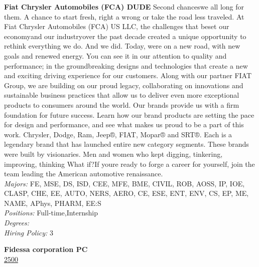 \documentclass[twoside]{article}
\begin{document}
\begin{center}
\begin{multicols}{2}
\begin{minipage}{.95\columnwidth}{\Large\bf Fiat Chrysler Automobiles (FCA) \hfill DUDE}
    Second chanceswe all long for them. A chance to start fresh, right a wrong or take the road less traveled. At Fiat Chrysler Automobiles (FCA) US LLC, the challenges that beset our economyand our industryover the past decade created a unique opportunity to rethink everything we do. And we did. Today, were on a new road, with new goals and renewed energy. You can see it in our attention to quality and performance; in the groundbreaking designs and technologies that create a new and exciting driving experience for our customers. Along with our partner FIAT Group, we are building on our proud legacy, collaborating on innovations and sustainable business practices that allow us to deliver even more exceptional products to consumers around the world. Our brands provide us with a firm foundation for future success. Learn how our brand products are setting the pace for design and performance, and see what makes us proud to be a part of this work. Chrysler, Dodge, Ram, Jeep®, FIAT, Mopar® and SRT®. Each is a legendary brand that has launched entire new category segments. These brands were built by visionaries. Men and women who kept digging, tinkering, improving, thinking What if?If youre ready to forge a career for yourself, join the team leading the American automotive renaissance.\\
    \emph{Majors:} FE, MSE, DS, ISD, CEE, MFE, BME, CIVIL, ROB, AOSS, IP, IOE, CLASP, CHE, EE, AUTO, NERS, AERO, CE, ESE, ENT, ENV, CS, EP, ME, NAME, APhys, PHARM, EE:S\\
    \emph{Positions:} Full-time,Internship\\
    \emph{Degrees:} \\
    \emph{Hiring Policy:} 3\\
\end{minipage}
 \begin{minipage}{.95\columnwidth}{\Large\bf Fidessa corporation \hfill PC}\\
    \url{2500}\\

\end{minipage}
\end{multicols}
\end{center}
\end{document}
